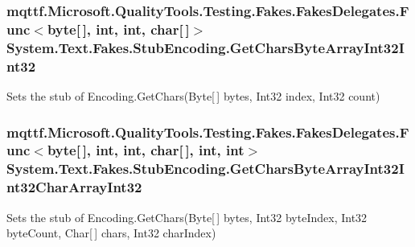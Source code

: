 \hypertarget{class_system_1_1_text_1_1_fakes_1_1_stub_encoding_aba99924f5b3fc1116e5346d30647978f}{
\subsubsection[{Get\-Chars\-Byte\-Array\-Int32\-Int32}]{\setlength{\rightskip}{0pt plus 5cm}mqttf.\-Microsoft.\-Quality\-Tools.\-Testing.\-Fakes.\-Fakes\-Delegates.\-Func$<$byte\mbox{[}$\,$\mbox{]}, int, int, char\mbox{[}$\,$\mbox{]}$>$ System.\-Text.\-Fakes.\-Stub\-Encoding.\-Get\-Chars\-Byte\-Array\-Int32\-Int32}}\label{class_system_1_1_text_1_1_fakes_1_1_stub_encoding_aba99924f5b3fc1116e5346d30647978f}


Sets the stub of Encoding.\-Get\-Chars(\-Byte\mbox{[}$\,$\mbox{]} bytes, Int32 index, Int32 count)

\hypertarget{class_system_1_1_text_1_1_fakes_1_1_stub_encoding_ab3409d03aaad00bddb0cf60d900b22b1}{
\subsubsection[{Get\-Chars\-Byte\-Array\-Int32\-Int32\-Char\-Array\-Int32}]{\setlength{\rightskip}{0pt plus 5cm}mqttf.\-Microsoft.\-Quality\-Tools.\-Testing.\-Fakes.\-Fakes\-Delegates.\-Func$<$byte\mbox{[}$\,$\mbox{]}, int, int, char\mbox{[}$\,$\mbox{]}, int, int$>$ System.\-Text.\-Fakes.\-Stub\-Encoding.\-Get\-Chars\-Byte\-Array\-Int32\-Int32\-Char\-Array\-Int32}}\label{class_system_1_1_text_1_1_fakes_1_1_stub_encoding_ab3409d03aaad00bddb0cf60d900b22b1}


Sets the stub of Encoding.\-Get\-Chars(\-Byte\mbox{[}$\,$\mbox{]} bytes, Int32 byte\-Index, Int32 byte\-Count, Char\mbox{[}$\,$\mbox{]} chars, Int32 char\-Index)

